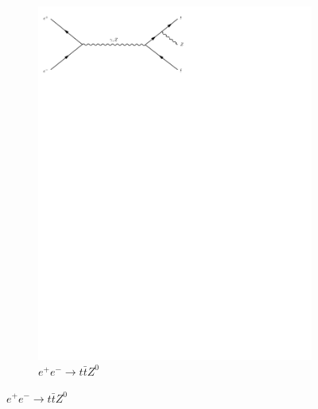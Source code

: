 \begin{figure}[h]
\begin{subfigure}[b]{0.3\textwidth}
    \includegraphics[trim={0.5cm 22cm 10cm 0cm},width=\textwidth]{../Diagrams/D20.pdf}
    \caption{$e^+e^- \rightarrow t\bar{t}Z^0$}
    \label{fey:20}
  \end{subfigure}
\end{figure}
